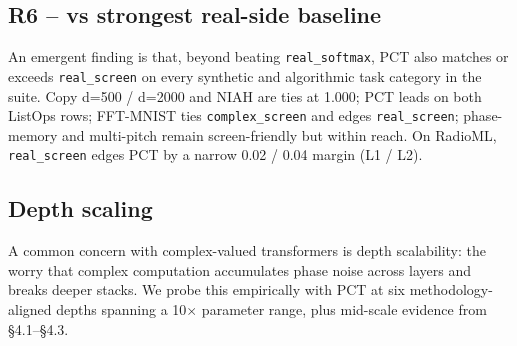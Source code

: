 \documentclass[11pt,a4paper]{article}
\theoremstyle{plain}
\theoremstyle{definition}
\begin{document}
\subsection{R6 -- vs strongest real-side baseline}
\noindent
\begin{minipage}[t]{0.47\textwidth}
\vspace{0pt}
\raggedright
\sloppy
An emergent finding is that, beyond beating \texttt{real\_softmax}, PCT also matches or exceeds \texttt{real\_screen} on every synthetic and algorithmic task category in the suite. Copy d=500 / d=2000 and NIAH are ties at 1.000; PCT leads on both ListOps rows; FFT-MNIST ties \texttt{complex\_screen} and edges \texttt{real\_screen}; phase-memory and multi-pitch remain screen-friendly but within reach. On RadioML, \texttt{real\_screen} edges PCT by a narrow 0.02 / 0.04 margin (L1 / L2).
\end{minipage}\hfill
\begin{minipage}[t]{0.30\textwidth}
\vspace{0pt}
\centering
{\fontsize{5.6}{6.4}\selectfont
\setlength{\tabcolsep}{1.4pt}
\renewcommand{\arraystretch}{1.05}
}
\captionsetup{skip=2pt}
\end{minipage}
\par\medskip

\subsection{Depth scaling}
A common concern with complex-valued transformers is depth scalability: the worry that complex computation accumulates phase noise across layers and breaks deeper stacks. We probe this empirically with PCT at six methodology-aligned depths spanning a 10$\times$ parameter range, plus mid-scale evidence from \S{}4.1--\S{}4.3.
\end{document}
